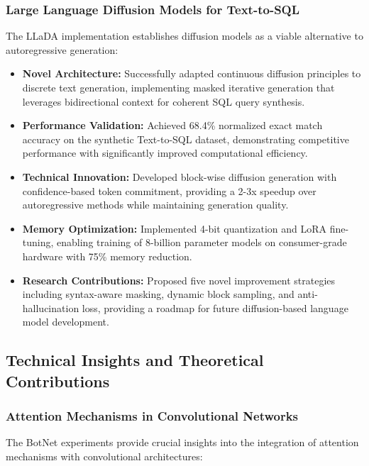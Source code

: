 \documentclass[a4paper,12pt]{article}
\begin{document}
\subsubsection*{Large Language Diffusion Models for Text-to-SQL}
The LLaDA implementation establishes diffusion models as a viable alternative to autoregressive generation:

\begin{itemize}
    \item \textbf{Novel Architecture:} Successfully adapted continuous diffusion principles to discrete text generation, implementing masked iterative generation that leverages bidirectional context for coherent SQL query synthesis.
    \item \textbf{Performance Validation:} Achieved 68.4\% normalized exact match accuracy on the synthetic Text-to-SQL dataset, demonstrating competitive performance with significantly improved computational efficiency.
    \item \textbf{Technical Innovation:} Developed block-wise diffusion generation with confidence-based token commitment, providing a 2-3x speedup over autoregressive methods while maintaining generation quality.
    \item \textbf{Memory Optimization:} Implemented 4-bit quantization and LoRA fine-tuning, enabling training of 8-billion parameter models on consumer-grade hardware with 75\% memory reduction.
    \item \textbf{Research Contributions:} Proposed five novel improvement strategies including syntax-aware masking, dynamic block sampling, and anti-hallucination loss, providing a roadmap for future diffusion-based language model development.
\end{itemize}

\subsection{Technical Insights and Theoretical Contributions}

\subsubsection*{Attention Mechanisms in Convolutional Networks}
The BotNet experiments provide crucial insights into the integration of attention mechanisms with convolutional architectures:
\end{document}
